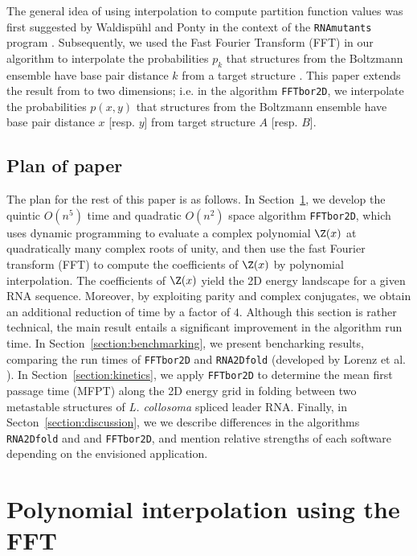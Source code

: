 The general idea of using
interpolation to compute partition function values was first suggested
by Waldisp\"uhl and Ponty in the context of the
{\tt RNAmutants} program \cite{waldispuhlPontyRecomb}. Subsequently,
we used the Fast Fourier Transform (FFT) in our algorithm
\fftbor \cite{fftbor}  to interpolate the
probabilities $p_k$ that structures from the Boltzmann
ensemble have base pair distance $k$ from a target structure \strSt.
This paper extends the result from \cite{fftbor} to two dimensions; i.e.
in the algorithm {\tt FFTbor2D},
we interpolate the probabilities $p(x,y)$ that
structures from the Boltzmann ensemble have base pair distance
$x$ [resp. $y$] from target structure $A$ [resp. $B$].

\subsection{Plan of paper}

The plan for the rest of this paper is as follows. In
Section~\ref{section:approach}, we develop the quintic
$O(n^5)$ time and quadratic $O(n^2)$ space algorithm {\tt FFTbor2D},
which uses dynamic programming to evaluate a complex polynomial
$\Z(x)$ at quadratically many complex roots of unity, and then use the fast
Fourier transform (FFT) to compute the coefficients of $\Z(x)$ by
polynomial interpolation. The coefficients of $\Z(x)$ yield the 2D
energy landscape for a given RNA sequence. Moreover, by exploiting
parity and complex conjugates, we obtain an additional reduction of time
by a factor of $4$. Although this section is rather technical, the
main result entails a significant improvement in the algorithm
run time.
In Section~\ref{section:benchmarking}, we present bencharking results,
comparing the run times of {\tt FFTbor2D} and {\tt RNA2Dfold}
(developed by Lorenz et al.  \cite{hofacker:RNAbor2D}).
In Section~\ref{section:kinetics}, we apply {\tt FFTbor2D} to determine
the mean first passage time (MFPT) along the 2D energy grid in folding
between two metastable structures of {\em L. collosoma} spliced leader
RNA.
Finally, in Secton~\ref{section:discussion}, we we describe
differences in the algorithms {\tt RNA2Dfold} and
and {\tt FFTbor2D}, and mention relative strengths of each software
depending on the envisioned application.

\section{Polynomial interpolation using the FFT}
\label{section:approach}

